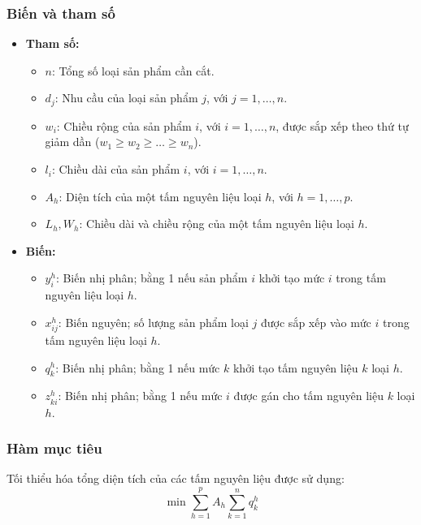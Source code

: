 \subsubsection{Biến và tham số}  
\begin{itemize}  
    \item \textbf{Tham số:}  
    \begin{itemize}  
        \item $n$: Tổng số loại sản phẩm cần cắt.  
        \item $d_j$: Nhu cầu của loại sản phẩm $j$, với $j = 1, \dots, n$.  
        \item $w_i$: Chiều rộng của sản phẩm $i$, với $i = 1, \dots, n$, được sắp xếp theo thứ tự giảm dần ($w_1 \geq w_2 \geq \dots \geq w_n$).  
        \item $l_i$: Chiều dài của sản phẩm $i$, với $i = 1, \dots, n$.  
        \item $A_h$: Diện tích của một tấm nguyên liệu loại $h$, với $h = 1, \dots, p$.  
        \item $L_h, W_h$: Chiều dài và chiều rộng của một tấm nguyên liệu loại $h$.  
    \end{itemize}  
    \item \textbf{Biến:}  
    \begin{itemize}  
        \item $y_i^h$: Biến nhị phân; bằng 1 nếu sản phẩm $i$ khởi tạo mức $i$ trong tấm nguyên liệu loại $h$.  
        \item $x_{ij}^h$: Biến nguyên; số lượng sản phẩm loại $j$ được sắp xếp vào mức $i$ trong tấm nguyên liệu loại $h$.  
        \item $q_k^h$: Biến nhị phân; bằng 1 nếu mức $k$ khởi tạo tấm nguyên liệu $k$ loại $h$.  
        \item $z_{ki}^h$: Biến nhị phân; bằng 1 nếu mức $i$ được gán cho tấm nguyên liệu $k$ loại $h$.  
    \end{itemize}  
\end{itemize}  

\subsubsection{Hàm mục tiêu}  
Tối thiểu hóa tổng diện tích của các tấm nguyên liệu được sử dụng:  
\[
\min \sum_{h=1}^{p} A_h \sum_{k=1}^{n} q_k^h
\]  

